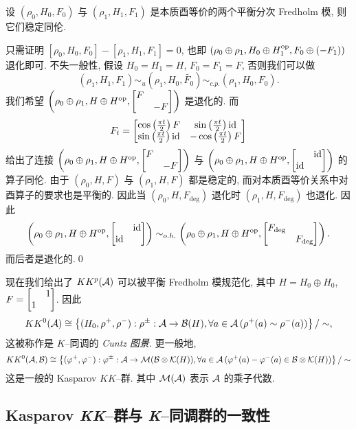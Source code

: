 \begin{Proposition}
	设 $ (\rho_0, H_0, F_0) $ 与 $ (\rho_1, H_1, F_1) $ 是本质酉等价的两个平衡分次 Fredholm 模, 则它们稳定同伦.
\end{Proposition}
\begin{Proof}
	只需证明 $ [\rho_0, H_0, F_0]-[\rho_1, H_1, F_1]=0 $, 也即 $ (\rho_0\oplus\rho_1, H_0\oplus H_1^{\text{op}}, F_0\oplus(-F_1)) $ 退化即可. 不失一般性, 假设 $ H_0=H_1=H $, $ F_0=F_1=F $, 否则我们可以做
	\[
		(\rho_1, H_1, F_1)\sim_u(\rho_1, H_0, \tilde{F_0})\sim_{c.p.}(\rho_1, H_0, F_0).
	\]
	我们希望 $ \left(\rho_0\oplus\rho_1, H\oplus H^{\op}, \mqty[F & \\ & -F]\right) $ 是退化的. 而
	\[
		F_t=\mqty[\cos\left(\frac{\pi t}{2}\right)F & \sin\left(\frac{\pi t}{2}\right)\id \\ \sin\left(\frac{\pi t}{2}\right)\id & -\cos\left(\frac{\pi t}{2}\right)F]
	\]
	给出了连接 $ \left(\rho_0\oplus\rho_1, H\oplus H^{\op}, \mqty[F & \\ & -F]\right) $ 与 $ \left(\rho_0\oplus\rho_1, H\oplus H^{\op}, \mqty[ & \id \\ \id &]\right) $ 的算子同伦. 由于 $ (\rho_0, H, F) $ 与 $ (\rho_1, H, F) $ 都是稳定的, 而对本质酉等价关系中对酉算子的要求也是平衡的. 因此当 $ (\rho_0, H, F_{\text{deg}}) $ 退化时 $ (\rho_1, H, F_{\text{deg}}) $ 也退化. 因此
	\[
		\left(\rho_0\oplus\rho_1, H\oplus H^{\op}, \mqty[& \id \\ \id &]\right)\sim_{o.h.}\left(\rho_0\oplus\rho_1, H\oplus H^{\op}, \mqty[ F_{\text{deg}} & \\ & F_{\text{deg}}]\right).
	\]
	而后者是退化的.\qed
\end{Proof}

现在我们给出了 $ KK^p(\mathcal{A}) $ 可以被平衡 Fredholm 模规范化, 其中 $ H=H_0\oplus H_0 $, $ F=\mqty[ & 1 \\ 1 &] $. 因此
\[
	KK^0(\mathcal{A})\cong\left\{ (H_0, \rho^+, \rho^-) : \rho^{\pm} : \mathcal{A}\to\mathcal{B}(H), \forall a\in\mathcal{A}\,(\rho^+(a)\sim\rho^-(a)) \right\}/\sim,
\]
这被称作是 $ K $--同调的 \emph{Cuntz 图景}. 更一般地,
\[
	KK^0(\mathcal{A},\mathcal{B})\cong\left\{ (\varphi^+,\varphi^-) : \varphi^{\pm} : \mathcal{A}\to\mathcal{M}(\mathcal{B}\otimes\mathcal{K}(H)), \forall a\in\mathcal{A}\,(\varphi^+(a)-\varphi^-(a)\in\mathcal{B}\otimes\mathcal{K}(H)) \right\}/\sim
\]
这是一般的 Kasparov $ KK $--群. 其中 $ \mathcal{M}(\mathcal{A}) $ 表示 $ \mathcal{A} $ 的乘子代数.

\subsection{Kasparov \textit{KK}--群与 \textit{K}--同调群的一致性}

